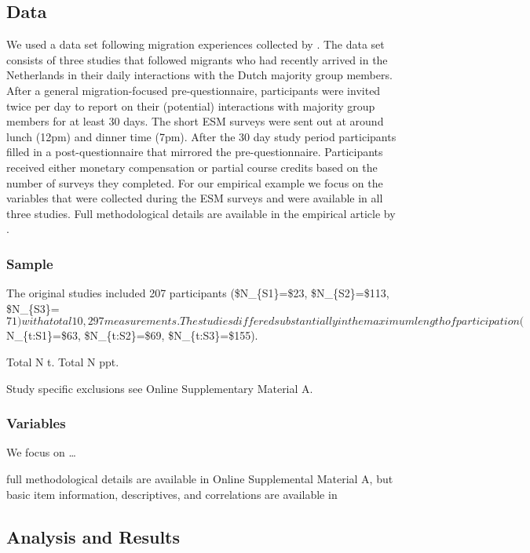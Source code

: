 \subsection{Data}

We used a data set following migration experiences collected by
\citet[][]{Kreienkamp2022b}. The data set consists of three studies that
followed migrants who had recently arrived in the Netherlands in their
daily interactions with the Dutch majority group members. After a
general migration-focused pre-questionnaire, participants were invited
twice per day to report on their (potential) interactions with majority
group members for at least 30 days. The short ESM surveys were sent out
at around lunch (12pm) and dinner time (7pm). After the 30 day study
period participants filled in a post-questionnaire that mirrored the
pre-questionnaire. Participants received either monetary compensation or
partial course credits based on the number of surveys they completed.
For our empirical example we focus on the variables that were collected
during the ESM surveys and were available in all three studies. Full
methodological details are available in the empirical article by
\citet[][]{Kreienkamp2022b}.

\subsubsection{Sample}

The original studies included 207 participants (\$N\_\{S1\}=\$23,
\$N\_\{S2\}=\$113,
\$N\_\{S3\}=\(71) with a total 10,297 measurements. The studies differed substantially in the maximum length of participation (\)N\_\{t:S1\}=\$63,
\$N\_\{t:S2\}=\$69, \$N\_\{t:S3\}=\$155).

\citep[proportion of missing data and imputations:][]{Madley-Dowd2019}

Total N t. Total N ppt.

Study specific exclusions see Online Supplementary Material A.

\subsubsection{Variables}

We focus on \ldots{}

full methodological details are available in Online Supplemental
Material A, but basic item information, descriptives, and correlations
are available in 

\subsection{Analysis and Results}

